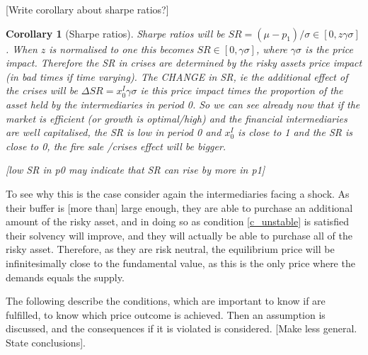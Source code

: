 \documentclass[11pt]{article}
\newtheorem{corollary}{Corollary}
\begin{document}
[Write corollary about sharpe ratios?] 
\begin{corollary}[Sharpe ratios]
Sharpe ratios will be $SR = ( \mu - p_1 ) / \sigma \in [0,z\gamma\sigma]$. When $z$ is normalised to one this becomes $SR \in [0,\gamma\sigma]$, where $\gamma\sigma$ is the price impact. Therefore the SR in crises are determined by the risky assets price impact (in bad times if time varying). The CHANGE in SR, ie the additional effect of the crises will be $\Delta SR = x^I_0\gamma\sigma$ ie this price impact times the proportion of the asset held by the intermediaries in period 0. So we can see already now that if the market is efficient (or growth is optimal/high) and the financial intermediaries are well capitalised, the SR is low in period 0 and $x^I_0$ is close to 1 and the SR is close to 0, the fire sale /crises effect will be bigger.

[low SR in p0 may indicate that SR can rise by more in p1]

\end{corollary}

To see why this is the case consider again the intermediaries facing a shock. As their buffer is [more than] large enough, they are able to purchase an additional amount of the risky asset, and in doing so as condition \ref{c_unstable} is satisfied their solvency will improve, and they will actually be able to purchase all of the risky asset. Therefore, as they are risk neutral, the equilibrium price will be infinitesimally close to the fundamental value, as this is the only price where the demands equals the supply.

The following describe the conditions, which are important to know if are fulfilled, to know which price outcome is achieved. Then an assumption is discussed, and the consequences if it is violated is considered. [Make less general. State conclusions].
\end{document}
